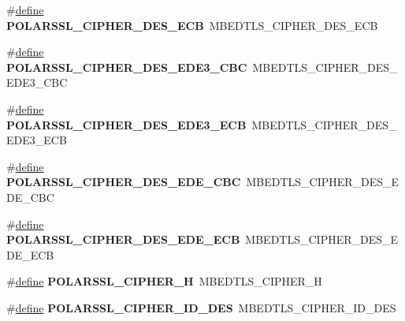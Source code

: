 \begin{DoxyCompactItemize}
\item 
\mbox{\label{compat-1_83_8h_a0155d387c4dfe111901753a289070a46}} 
\#\hyperlink{structdefine}{define} {\bfseries P\+O\+L\+A\+R\+S\+S\+L\+\_\+\+C\+I\+P\+H\+E\+R\+\_\+\+D\+E\+S\+\_\+\+E\+CB}~M\+B\+E\+D\+T\+L\+S\+\_\+\+C\+I\+P\+H\+E\+R\+\_\+\+D\+E\+S\+\_\+\+E\+CB
\item 
\mbox{\label{compat-1_83_8h_aaf0fce6a45d4bdd675f86f49ef864181}} 
\#\hyperlink{structdefine}{define} {\bfseries P\+O\+L\+A\+R\+S\+S\+L\+\_\+\+C\+I\+P\+H\+E\+R\+\_\+\+D\+E\+S\+\_\+\+E\+D\+E3\+\_\+\+C\+BC}~M\+B\+E\+D\+T\+L\+S\+\_\+\+C\+I\+P\+H\+E\+R\+\_\+\+D\+E\+S\+\_\+\+E\+D\+E3\+\_\+\+C\+BC
\item 
\mbox{\label{compat-1_83_8h_afdcfab71dcba93b2dcbc859e22c917f1}} 
\#\hyperlink{structdefine}{define} {\bfseries P\+O\+L\+A\+R\+S\+S\+L\+\_\+\+C\+I\+P\+H\+E\+R\+\_\+\+D\+E\+S\+\_\+\+E\+D\+E3\+\_\+\+E\+CB}~M\+B\+E\+D\+T\+L\+S\+\_\+\+C\+I\+P\+H\+E\+R\+\_\+\+D\+E\+S\+\_\+\+E\+D\+E3\+\_\+\+E\+CB
\item 
\mbox{\label{compat-1_83_8h_acd1a9274490f8ef51072111d0b3475dc}} 
\#\hyperlink{structdefine}{define} {\bfseries P\+O\+L\+A\+R\+S\+S\+L\+\_\+\+C\+I\+P\+H\+E\+R\+\_\+\+D\+E\+S\+\_\+\+E\+D\+E\+\_\+\+C\+BC}~M\+B\+E\+D\+T\+L\+S\+\_\+\+C\+I\+P\+H\+E\+R\+\_\+\+D\+E\+S\+\_\+\+E\+D\+E\+\_\+\+C\+BC
\item 
\mbox{\label{compat-1_83_8h_adab9befbbf774e65707133a623ca98fc}} 
\#\hyperlink{structdefine}{define} {\bfseries P\+O\+L\+A\+R\+S\+S\+L\+\_\+\+C\+I\+P\+H\+E\+R\+\_\+\+D\+E\+S\+\_\+\+E\+D\+E\+\_\+\+E\+CB}~M\+B\+E\+D\+T\+L\+S\+\_\+\+C\+I\+P\+H\+E\+R\+\_\+\+D\+E\+S\+\_\+\+E\+D\+E\+\_\+\+E\+CB
\item 
\mbox{\label{compat-1_83_8h_a968de3b3b96f78eacd65b1b14b5a71f4}} 
\#\hyperlink{structdefine}{define} {\bfseries P\+O\+L\+A\+R\+S\+S\+L\+\_\+\+C\+I\+P\+H\+E\+R\+\_\+H}~M\+B\+E\+D\+T\+L\+S\+\_\+\+C\+I\+P\+H\+E\+R\+\_\+H
\item 
\mbox{\label{compat-1_83_8h_af9d769419a80eff1059f34941595cafc}} 
\#\hyperlink{structdefine}{define} {\bfseries P\+O\+L\+A\+R\+S\+S\+L\+\_\+\+C\+I\+P\+H\+E\+R\+\_\+\+I\+D\+\_\+D\+ES}~M\+B\+E\+D\+T\+L\+S\+\_\+\+C\+I\+P\+H\+E\+R\+\_\+\+I\+D\+\_\+D\+ES

\end{DoxyCompactItemize}
